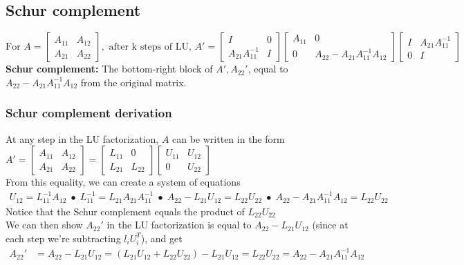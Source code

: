 \documentclass{article}
\begin{document}
\subsection{Schur complement}
\begin{equation*}
    \textrm{For } A = \begin{bmatrix} A_{11} & A_{12}\\ A_{21} & A_{22}\end{bmatrix}, \textrm{ after k steps of LU, }
    A' = \begin{bmatrix} I & 0\\ A_{21}A_{11}^{-1} & I\end{bmatrix}
    \begin{bmatrix} A_{11} & 0\\ 0 & A_{22} - A_{21}A_{11}^{-1}A_{12}\end{bmatrix}
    \begin{bmatrix} I & A_{21}A_{11}^{-1}\\ 0 & I\end{bmatrix}
\end{equation*}
\textbf{Schur complement:} The bottom-right block of $A', A_{22}'$, equal to $A_{22} - A_{21}A_{11}^{-1}A_{12}$ from the original matrix.

\subsubsection{Schur complement derivation}
At any step in the LU factorization, $A$ can be written in the form $A' = \begin{bmatrix} A_{11} & A_{12}\\ A_{21} & A_{22}\end{bmatrix} = \begin{bmatrix} L_{11} & 0\\ L_{21} & L_{22}\end{bmatrix} \begin{bmatrix} U_{11} & U_{12}\\ 0 & U_{22}\end{bmatrix}$\\
From this equality, we can create a system of equations
\begin{align*}
    U_{12} = L_{11}^{-1}A_{12} \;\bullet\; L_{11}^{-1} = L_{21}A_{21}A_{11}^{-1} \;\bullet\; A_{22} - L_{21}U_{12} = L_{22}U_{22} \;\bullet\; A_{22} - A_{21}A_{11}^{-1}A_{12} = L_{22}U_{22}
\end{align*}
Notice that the Schur complement equals the product of $L_{22}U_{22}$\\
We can then show $A_{22}'$ in the LU factorization is equal to $A_{22} - L_{21}U_{12}$ (since at each step we're subtracting $l_iU_i^T$), and get
\begin{align*}
    A_{22}' &= A_{22} - L_{21}U_{12} = (L_{21}U_{12} + L_{22}U_{22}) - L_{21}U_{12} = L_{22}U_{22} = A_{22} - A_{21}A_{11}^{-1}A_{12}
\end{align*}
\end{document}
